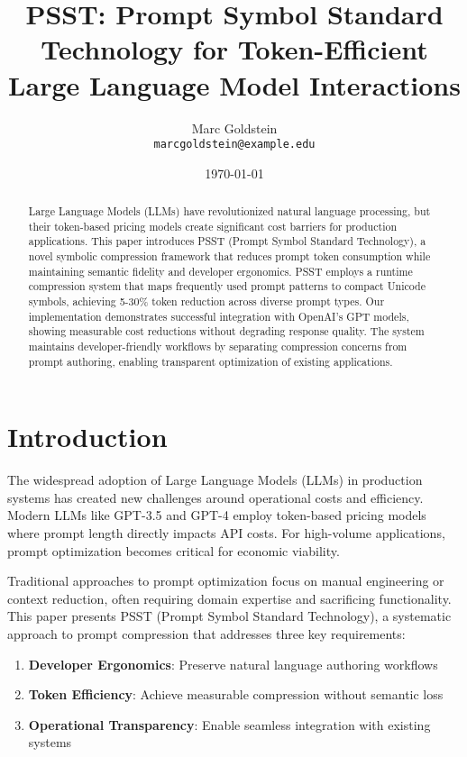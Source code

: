 \documentclass[11pt,twocolumn]{article}
\title{PSST: Prompt Symbol Standard Technology for Token-Efficient Large Language Model Interactions}
\author{
Marc Goldstein\\
\texttt{marcgoldstein@example.edu}
}
\date{\today}
\begin{document}
\maketitle

\begin{abstract}
Large Language Models (LLMs) have revolutionized natural language processing, but their token-based pricing models create significant cost barriers for production applications. This paper introduces PSST (Prompt Symbol Standard Technology), a novel symbolic compression framework that reduces prompt token consumption while maintaining semantic fidelity and developer ergonomics. PSST employs a runtime compression system that maps frequently used prompt patterns to compact Unicode symbols, achieving 5-30\% token reduction across diverse prompt types. Our implementation demonstrates successful integration with OpenAI's GPT models, showing measurable cost reductions without degrading response quality. The system maintains developer-friendly workflows by separating compression concerns from prompt authoring, enabling transparent optimization of existing applications.
\end{abstract}

\section{Introduction}

The widespread adoption of Large Language Models (LLMs) in production systems has created new challenges around operational costs and efficiency. Modern LLMs like GPT-3.5 and GPT-4 employ token-based pricing models where prompt length directly impacts API costs. For high-volume applications, prompt optimization becomes critical for economic viability.

Traditional approaches to prompt optimization focus on manual engineering or context reduction, often requiring domain expertise and sacrificing functionality. This paper presents PSST (Prompt Symbol Standard Technology), a systematic approach to prompt compression that addresses three key requirements:

\begin{enumerate}
\item \textbf{Developer Ergonomics}: Preserve natural language authoring workflows
\item \textbf{Token Efficiency}: Achieve measurable compression without semantic loss
\item \textbf{Operational Transparency}: Enable seamless integration with existing systems
\end{enumerate}
\end{document}
